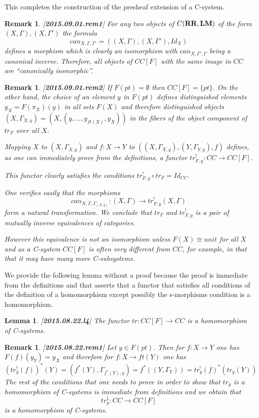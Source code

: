 \documentclass[11pt]{article}
\newtheorem{lemma}[proposition]{Lemma}
\newtheorem{remark}[proposition]{Remark}
\newcommand{\llabel}[1]{\label{#1}[{\bf #1}]}
\newcommand{\sr}{\rightarrow}
\newcommand{\RR}{{\bf RR}}
\newcommand{\LM}{{\bf LM}}
\begin{document}
This completes the construction of the presheaf extension of a C-system. 
%
\begin{remark}\rm
\llabel{2015.09.01.rem1}
For any two objects of $C(\RR,\LM)$ of the form $(X,\Gamma),(X,\Gamma')$ the formula
%
$$can_{X,\Gamma,\Gamma'}=((X,\Gamma),(X,\Gamma'),Id_X)$$
%
defines a morphism which is clearly an isomorphism with $can_{X,\Gamma',\Gamma}$ being a canonical inverse. Therefore, all objects of $CC[F]$ with the same image in $CC$ are ``canonically isomorphic''. 
\end{remark}
%
\begin{remark}\rm
\llabel{2015.09.01.rem2}
If $F(pt)=\emptyset$ then $CC[F]=\{pt\}$. On the other hand, the choice of an element $y$ in $F(pt)$ defines distinguished elements $y_X=F(\pi_X)(y)$ in all sets $F(X)$ and therefore distinguished objects $(X,\Gamma_{X,y})=(X,(y,\dots,y_{ft(X)},y_X))$ in the fibers of the object component of $tr_{F}$ over all $X$. 

Mapping $X$ to $(X,\Gamma_{X,y})$ and $f:X\sr Y$ to $((X,\Gamma_{X,y}),(Y,\Gamma_{Y,y}),f)$ defines, as one can immediately prove from the definitions, a functor $tr_{F,y}^!:CC\sr CC[F]$. 

This functor clearly satisfies the conditions $tr^!_{F,y}\circ tr_F=Id_{CC}$.

One verifies easily that the morphisms 
%
$$can_{X,\Gamma,\Gamma_{(X,y)}}:(X,\Gamma)\sr tr^!_{F,y}(X,\Gamma)$$
%
form a natural transformation. We conclude that $tr_F$ and $tr^!_{F,y}$ is a pair of mutually inverse equivalences of categories.

However this equivalence is not an isomorphism unless $F(X)\cong unit$ for all $X$ and as a C-system $CC[F]$ is often very different from $CC$, for example, in that that it may have many more C-subsystems.  
\end{remark}
%
We provide the following lemma without a proof because the proof is immediate from the definitions and \cite[Lemma 3.4]{Cfromauniverse} that asserts that a functor that satisfies all conditions of the definition of a homomorphism except possibly the s-morphisms condition is a homomorphism. 
%
\begin{lemma}
\llabel{2015.08.22.l4}
The functor $tr:CC[F]\sr CC$ is a homomorphism of C-systems.
\end{lemma}
%
\begin{remark}\rm
\llabel{2015.08.22.rem1} 
Let $y\in F(pt)$. Then for $f:X\sr Y$ one has $F(f)(y_{Y})=y_X$ and therefore for $f:X\sr ft(Y)$ one has
%
$$(tr^!_{y}(f))^*(Y)=(f^*(Y),\Gamma_{f^*(Y),y})=f^*((Y,\Gamma_Y))=tr^!_y(f)^*(tr_y(Y))$$
%
The rest of the conditions that one needs to prove in order to show that $tr_y$ is a homomorphism of C-systems is immediate from definitions and we obtain that 
%
$$tr^1_y:CC\sr CC[F]$$
%
is a homomorphism of C-systems.  
\end{remark}
%
\end{document}
